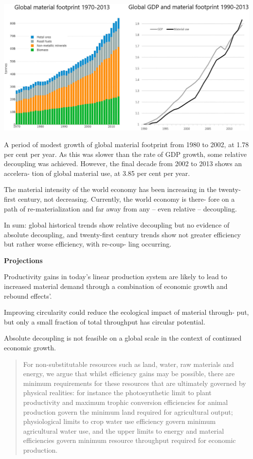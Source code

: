 \documentclass[
]{book}
\begin{document}
\includegraphics{fig/global_material_footprint.png}

A period of modest growth of global material footprint
from 1980 to 2002, at 1.78 per cent per year. As this was slower than the rate of GDP growth, some
relative decoupling was achieved. However, the final decade from 2002 to 2013 shows an accelera-
tion of global material use, at 3.85 per cent per year.

The material intensity of the world economy has been increasing
in the twenty-first century, not decreasing.
Currently, the world economy is there-
fore on a path of re-materialization and far away from any -- even relative -- decoupling.

In sum: global historical trends show relative decoupling but no evidence of absolute decoupling,
and twenty-first century trends show not greater efficiency but rather worse efficiency, with re-coup-
ling occurring.

\textbf{Projections}

Productivity gains in today's linear production system are likely to lead to increased material
demand through a combination of economic growth and rebound effects'.

Improving circularity could reduce the ecological impact of material through-
put, but only a small fraction of total throughput has circular potential.

Absolute decoupling is not feasible on a global scale in the context of
continued economic growth.

\begin{quote}
For non-substitutable resources such as land, water, raw materials and energy, we argue that whilst efficiency
gains may be possible, there are minimum requirements for these resources that are ultimately governed by
physical realities: for instance the photosynthetic limit to plant productivity and maximum trophic conversion
efficiencies for animal production govern the minimum land required for agricultural output; physiological
limits to crop water use efficiency govern minimum agricultural water use, and the upper limits to energy and
material efficiencies govern minimum resource throughput required for economic production.
\end{quote}
\end{document}
